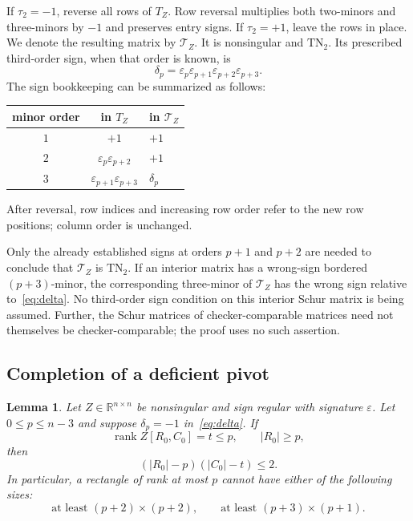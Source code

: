 \documentclass[10pt,a4paper]{article}
\newtheorem{lemma}[theorem]{Lemma}
\theoremstyle{definition}
\theoremstyle{remark}
\numberwithin{equation}{section}
\newcommand{\R}{\mathbb R}
\newcommand{\eps}{\varepsilon}
\DeclareMathOperator{\rank}{rank}
\begin{document}
If $\tau_2=-1$, reverse all rows of $T_Z$. Row reversal multiplies
both two-minors and three-minors by $-1$ and preserves entry signs.
If $\tau_2=+1$, leave the rows in place. We denote the resulting
matrix by $\mathcal T_Z$. It is nonsingular and $\mathrm{TN}_2$.
Its prescribed third-order sign, when that order is known, is
\begin{equation}\label{eq:delta}
 \delta_p=\eps_p\eps_{p+1}\eps_{p+2}\eps_{p+3}.
\end{equation}
The sign bookkeeping can be summarized as follows:
\begin{center}
\begin{tabular}{ccl}
\toprule
minor order & in $T_Z$ & in $\mathcal T_Z$\\
\midrule
$1$ & $+1$ & $+1$\\
$2$ & $\eps_p\eps_{p+2}$ & $+1$\\
$3$ & $\eps_{p+1}\eps_{p+3}$ & $\delta_p$\\
\bottomrule
\end{tabular}
\end{center}
After reversal, row indices and increasing row order refer to the
new row positions; column order is unchanged.

Only the already established signs at orders $p+1$ and $p+2$ are
needed to conclude that $\mathcal T_Z$ is $\mathrm{TN}_2$.
If an interior matrix has a wrong-sign bordered $(p+3)$-minor,
the corresponding three-minor of $\mathcal T_Z$ has the wrong sign
relative to~\eqref{eq:delta}. No third-order sign condition on this
interior Schur matrix is being assumed. Further, the Schur matrices
of checker-comparable matrices need not themselves be
checker-comparable; the proof uses no such assertion.

\subsection{Completion of a deficient pivot}

\begin{lemma}\label{lem:rank-obstruction}
Let $Z\in\R^{n\times n}$ be nonsingular and sign regular with
signature $\eps$. Let $0\leq p\leq n-3$ and suppose
$\delta_p=-1$ in~\eqref{eq:delta}. If
\[
 \rank Z[R_0,C_0]=t\leq p,\qquad |R_0|\geq p,
\]
then
\begin{equation}\label{eq:zero-area}
 (|R_0|-p)(|C_0|-t)\leq2.
\end{equation}
In particular, a rectangle of rank at most $p$ cannot have either
of the following sizes:
\begin{equation}\label{eq:forbidden-sizes}
 \text{at least }(p+2)\times(p+2),\qquad
 \text{at least }(p+3)\times(p+1).
\end{equation}
\end{lemma}
\end{document}
